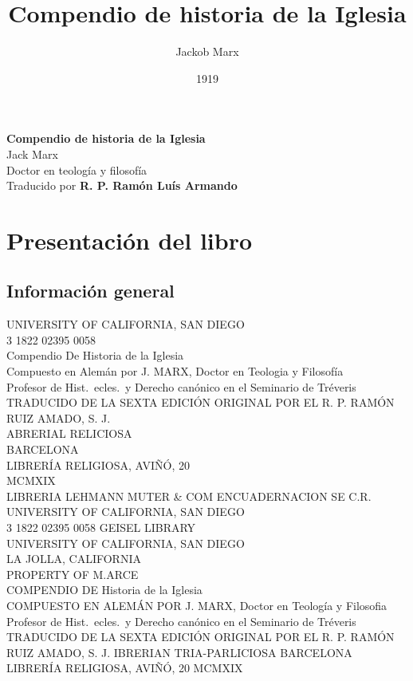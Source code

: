 \raggedbottom{} \documentclass[12pt, a4paper, openany]{book} %
\title{Compendio de historia de la Iglesia}
\author{Jackob Marx}
\date{1919}
\begin{document}
\begin{titlepage}
  \begin{center}
    {\Huge \textbf{Compendio de historia de la Iglesia} } \\
    \vspace{6mm}
    {\huge Jack Marx}\\
    \vspace{1mm}
    {Doctor en teología y filosofía}\\%
    \vspace{18cm}
    {\large Traducido por \textbf{R. P. Ramón Luís Armando}}
  \end{center}
\end{titlepage}
{\hypersetup{linkcolor=black}
\tableofcontents
}
\chapter{Presentación del libro}
\section{Información general}
\begin{flushleft}
  \noindent UNIVERSITY OF CALIFORNIA, SAN DIEGO\\
  3 1822 02395 0058\\
  Compendio
  De
  Historia de la Iglesia\\
  Compuesto en Alemán por
  J. MARX, Doctor en Teologia y Filosofía\\
  Profesor de Hist.\ ecles.\ y Derecho canónico en el Seminario de Tréveris\\[2em]
  TRADUCIDO DE LA SEXTA EDICIÓN ORIGINAL
  POR EL
  R. P. RAMÓN RUIZ AMADO, S. J.\\
  ABRERIAL RELICIOSA\\
  BARCELONA\\
  LIBRERÍA RELIGIOSA, AVIÑÓ, 20\\
  MCMXIX\\[1em]
  \noindent LIBRERIA LEHMANN MUTER \& COM ENCUADERNACION SE C.R.\\[1em]
  \noindent UNIVERSITY OF CALIFORNIA, SAN DIEGO\\
  3 1822 02395 0058
  GEISEL LIBRARY\\
  UNIVERSITY OF CALIFORNIA, SAN DIEGO\\
  LA JOLLA, CALIFORNIA\\

  PROPERTY
  OF
  M.ARCE\\
  COMPENDIO
  DE
  Historia de la Iglesia\\
  COMPUESTO EN ALEMÁN POR
  J. MARX, Doctor en Teología y Filosofia
  Profesor de Hist.\ ecles.\ y Derecho canónico en el Seminario de Tréveris
  TRADUCIDO DE LA SEXTA EDICIÓN ORIGINAL
  POR EL
  R. P. RAMÓN RUIZ AMADO, S. J.
  IBRERIAN
  TRIA-PARLICIOSA
  BARCELONA
  LIBRERÍA RELIGIOSA, AVIÑÓ, 20
  MCMXIX
\end{flushleft}
\newpage
\end{document}
